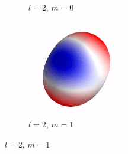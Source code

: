 \begin{figure}[ht]
\begin{subfigure}[b]{0.2\linewidth}
        \caption*{$l=2,\,m=0$}
    \end{subfigure}%
    \begin{subfigure}[b]{0.2\linewidth}
        \includegraphics[width=\linewidth]{introduction/images/2_1.png}
        \caption*{$l=2,\,m=1$}
    \end{subfigure}


\end{figure}
